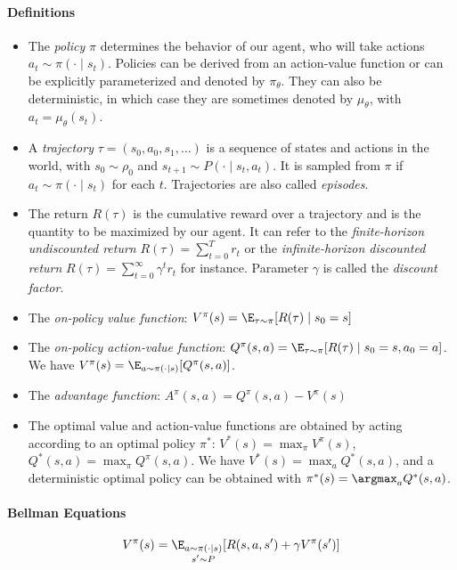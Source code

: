 \paragraph{Definitions}
\begin{itemize}
    \item The \emph{policy} $\pi$ determines the behavior of our agent, who will take actions $a_t \sim \pi(\cdot \mid s_t)$. Policies can be derived from an action-value function or can be explicitly parameterized and denoted by $\pi_{\theta}$. They can also be deterministic, in which case they are sometimes denoted by $\mu_{\theta}$, with $a_t = \mu_{\theta}(s_t)$.
    \item A \emph{trajectory} $\tau = (s_0, a_0, s_1, \dots)$ is a sequence of states and actions in the world, with $s_0 \sim \rho_0$ and $s_{t+1} \sim P(\cdot \mid s_t, a_t)$. It is sampled from $\pi$ if $a_t \sim \pi(\cdot \mid s_t)$ for each $t$. Trajectories are also called \emph{episodes}.
    \item The return $R(\tau)$ is the cumulative reward over a trajectory and is the quantity to be maximized by our agent. It can refer to the \emph{finite-horizon undiscounted return} $R(\tau) = \sum_{t=0}^T r_t$ or the \emph{infinite-horizon discounted return} $R(\tau) = \sum_{t=0}^{\infty} \gamma^t r_t$ for instance. Parameter $\gamma$ is called the \emph{discount factor}.
    \item The \emph{on-policy value function}: $V^{\pi}(s) = \E_{\tau \sim \pi}[R(\tau) \mid s_0=s]$
    \item The \emph{on-policy action-value function}: $Q^{\pi}(s,a) = \E_{\tau \sim \pi}[R(\tau) \mid s_0=s, a_0=a]$. We have $V^{\pi}(s) = \E_{a \sim \pi(\cdot \mid s)}[Q^\pi(s,a)]$.
    \item The \emph{advantage function}: $A^\pi(s,a) = Q^\pi(s,a) - V^\pi(s)$
    \item The optimal value and action-value functions are obtained by acting according to an optimal policy $\pi^*$: $V^*(s) = \max_{\pi} V^{\pi}(s)$, $Q^*(s,a) = \max_{\pi} Q^{\pi}(s,a)$. We have $V^*(s) = \max_a Q^*(s,a)$, and a deterministic optimal policy can be obtained with $\pi^*(s) = \argmax_a Q^*(s,a)$.
\end{itemize}

\paragraph{Bellman Equations}
\begin{equation}
    V^{\pi}(s) = \E_{\substack{a \sim \pi(\cdot \mid s) \\ s' \sim P}}[R(s, a, s') + \gamma V^{\pi}(s')]
\label{eq:bellman-v}
\end{equation}

